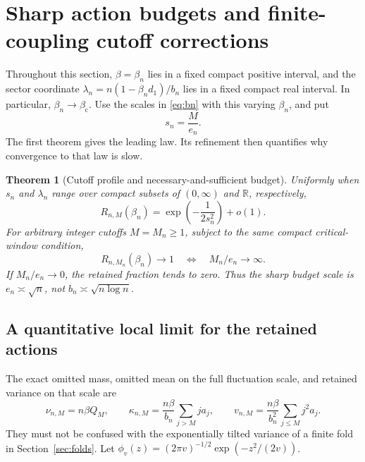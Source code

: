\documentclass[11pt,a4paper]{article}
\numberwithin{equation}{section}
\newtheorem{theorem}{Theorem}[section]
\theoremstyle{definition}
\theoremstyle{remark}
\newcommand{\R}{\mathbb R}
\newcommand{\bc}{\beta_{\mathrm c}}
\newcommand{\ph}{\phi}
\begin{document}
\section{Sharp action budgets and finite-coupling cutoff corrections}
\label{sec:cutoff}

Throughout this section, $\beta=\beta_n$ lies in a fixed compact positive
interval, and the sector coordinate
$\lambda_n=n(1-\beta_n d_1)/b_n$ lies in a fixed compact real interval.
In particular, $\beta_n\to\bc$. Use the scales in
\eqref{eq:bn} with this varying $\beta_n$, and put
\begin{equation}\label{eq:sn}
 s_n=\frac{M}{e_n}.
\end{equation}
The first theorem gives the leading law. Its refinement then quantifies
why convergence to that law is slow.

\begin{theorem}[Cutoff profile and necessary-and-sufficient budget]
\label{thm:budget}
Uniformly when $s_n$ and $\lambda_n$ range over compact subsets of
$(0,\infty)$ and $\R$, respectively,
\begin{equation}\label{eq:leadingcutoff}
 R_{n,M}(\beta_n)=\exp\left(-\frac1{2s_n^2}\right)+o(1).
\end{equation}
For arbitrary integer cutoffs $M=M_n\ge1$, subject to the same compact
critical-window condition,
\begin{equation}\label{eq:budgetiff}
 \boxed{\quad R_{n,M_n}(\beta_n)\longrightarrow1
       \quad\Longleftrightarrow\quad M_n/e_n\longrightarrow\infty.\quad}
\end{equation}
If $M_n/e_n\to0$, the retained fraction tends to zero. Thus the sharp
budget scale is $e_n\asymp\sqrt n$, not $b_n\asymp\sqrt{n\log n}$.
\end{theorem}

\subsection{A quantitative local limit for the retained actions}
The exact omitted mass, omitted mean on the full fluctuation scale, and
retained variance on that scale are
\begin{equation}\label{eq:nukappav}
 \nu_{n,M}=n\beta Q_M,\qquad
 \kappa_{n,M}=\frac{n\beta}{b_n}\sum_{j>M}j a_j,\qquad
 v_{n,M}=\frac{n\beta}{b_n^2}\sum_{j\le M}j^2a_j.
\end{equation}
They must not be confused with the exponentially tilted variance of a
finite fold in Section~\ref{sec:folds}. Let
$\ph_v(z)=(2\pi v)^{-1/2}\exp(-z^2/(2v))$.
\end{document}
